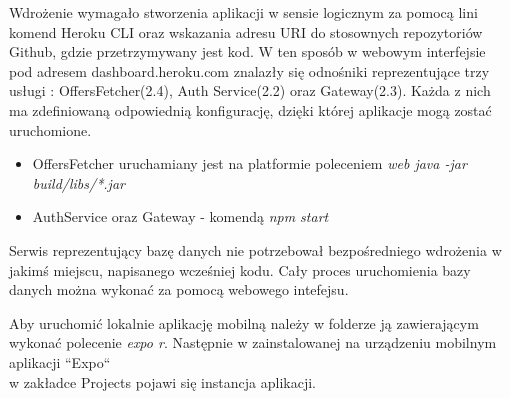 Wdrożenie wymagało stworzenia aplikacji w sensie logicznym za pomocą lini komend Heroku CLI oraz wskazania adresu URI do stosownych repozytoriów Github, gdzie przetrzymywany jest kod.
W ten sposób w webowym interfejsie pod adresem dashboard.heroku.com znalazły się odnośniki reprezentujące trzy usługi : OffersFetcher(2.4), Auth Service(2.2) oraz Gateway(2.3). Każda z nich ma zdefiniowaną odpowiednią konfigurację, dzięki której aplikacje mogą zostać uruchomione.
\begin{itemize}
	\item {OffersFetcher uruchamiany jest na platformie poleceniem \textit{web java -jar build/libs/*.jar}}
	\item {AuthService oraz Gateway - komendą \textit{npm start}}
\end{itemize}

Serwis reprezentujący bazę danych nie potrzebował bezpośredniego wdrożenia w jakimś miejscu, napisanego wcześniej kodu. Cały proces uruchomienia bazy danych można wykonać za pomocą webowego intefejsu.

Aby uruchomić lokalnie aplikację mobilną należy w folderze ją zawierającym wykonać polecenie \textit{expo r}. Następnie w zainstalowanej na urządzeniu mobilnym aplikacji ``Expo``\\ w zakładce Projects pojawi się instancja aplikacji.

